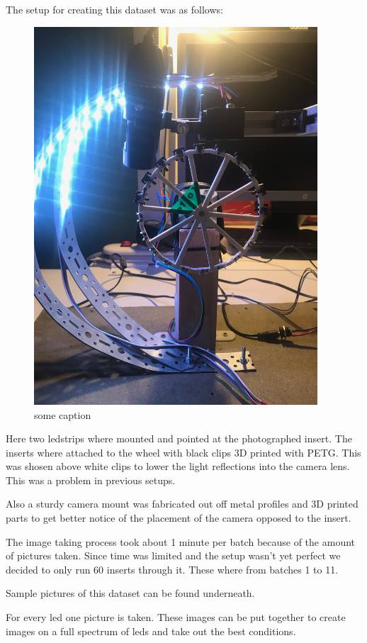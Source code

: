 The setup for creating this dataset was as follows:
\begin{figure}[hbtp]
\centering
\includegraphics[width=4.166667in, keepaspectratio=true, angle=270]{./fig/Vision/Dataset/automated_datasets/2_created_datasets/1_Birthday_dataset/IMG_9282.jpeg}
\caption{some caption}
\end{figure}

Here two ledstrips where mounted and pointed at the photographed insert. The inserts where attached to the wheel with black clips 3D printed with PETG. This was shosen above white clips to lower the light reflections into the camera lens. This was a problem in previous setups. 

Also a sturdy camera mount was fabricated out off metal profiles and 3D printed parts to get better notice of the placement of the camera opposed to the insert. 

The image taking process took about 1 minute per batch because of the amount of pictures taken. Since time was limited and the setup wasn't yet perfect we decided to only run 60 inserts through it. These where from batches 1 to 11. 

Sample pictures of this dataset can be found underneath. 

For every led one picture is taken. These images can be put together to create images on a full spectrum of leds and take out the best conditions. 

